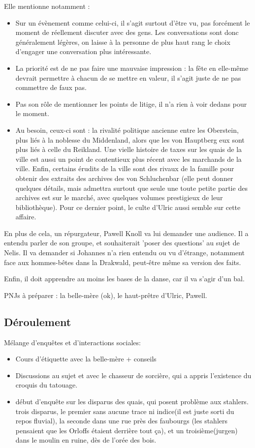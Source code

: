 \documentclass[10pt,a4paper]{book}
\begin{document}
Elle mentionne notamment :
\begin{itemize}
\item Sur un évènement comme celui-ci, il s'agit surtout d'être vu, pas forcément le moment de réellement discuter avec des gens. Les conversations sont donc généralement légères, on laisse à la personne de plus haut rang le choix d'engager une conversation plus intéressante.
\item La priorité est de ne pas faire une mauvaise impression : la fête en elle-même devrait permettre à chacun de se mettre en valeur, il s'agit juste de ne pas commettre de faux pas.
\item Pas son rôle de mentionner les points de litige, il n'a rien à voir dedans pour le moment.
\item Au besoin, ceux-ci sont : la rivalité politique ancienne entre les Oberstein, plus liés à la noblesse du Middenland, alors que les von Hauptberg eux sont plus liés à celle du Reikland. Une vielle histoire de taxes sur les quais de la ville est aussi un point de contentieux plus récent avec les marchands de la ville. Enfin, certains érudits de la ville sont des rivaux de la famille pour obtenir des extraits des archives des von Schluchenbar (elle peut donner quelques détails, mais admettra surtout que seule une toute petite partie des archives est sur le marché, avec quelques volumes prestigieux de leur bibliothèque). Pour ce dernier point, le culte d'Ulric aussi semble sur cette affaire.
\end{itemize}

En plus de cela, un répurgateur, Pawell Knoll va lui demander une audience. Il a entendu parler de son groupe, et souhaiterait 'poser des questions' au sujet de Nelis. Il va demander si Johannes n'a rien entendu ou vu d'étrange, notamment face aux hommes-bêtes dans la Drakwald, peut-être même sa version des faits.

Enfin, il doit apprendre au moins les bases de la danse, car il va s'agir d'un bal.

PNJs à préparer : la belle-mère (ok), le haut-prêtre d'Ulric, Pawell.
\subsection{Déroulement}
Mélange d'enquêtes et d'interactions sociales:
\begin{itemize}
\item Cours d'étiquette avec la belle-mère + conseils 
\item Discussions au sujet et avec le chasseur de sorcière, qui a appris l'existence du croquis du tatouage.
\item début d'enquête sur les disparus des quais, qui posent problème aux stahlers. trois disparus, le premier sans aucune trace ni indice(il est juste sorti du repos fluvial), la seconde dans une rue près des faubourgs (les stahlers pensaient que les Orloffs étaient derrière tout ça), et un troisième(jurgen) dans le moulin en ruine, dès de l'orée des bois.
\end{itemize}
\end{document}
